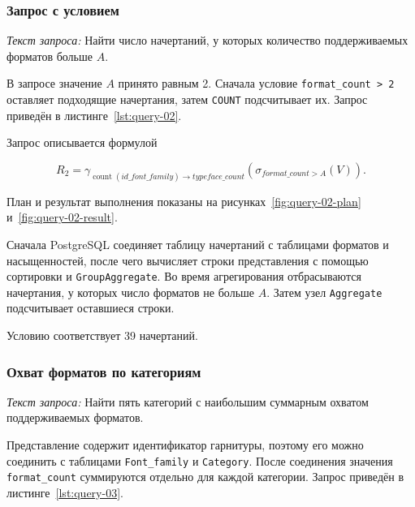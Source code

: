 \clearpage
\subsubsection{Запрос с условием}

\textit{Текст запроса:} Найти число начертаний, у которых количество поддерживаемых форматов больше
$A$.

В запросе значение $A$ принято равным 2. Сначала условие
\texttt{format_count > 2} оставляет подходящие начертания, затем
\texttt{COUNT} подсчитывает их. Запрос приведён в
листинге~\ref{lst:query-02}.


Запрос описывается формулой

\[
R_2 = \gamma_{\operatorname{count}(id\_font\_family)
\rightarrow typeface\_count}
\left(\sigma_{format\_count>A}(V)\right).
\]

План и результат выполнения показаны на
рисунках~\ref{fig:query-02-plan} и~\ref{fig:query-02-result}.


Сначала PostgreSQL соединяет таблицу начертаний с таблицами форматов и
насыщенностей, после чего вычисляет строки представления с помощью сортировки
и \texttt{GroupAggregate}. Во время агрегирования отбрасываются
начертания, у которых число форматов не больше $A$. Затем узел
\texttt{Aggregate} подсчитывает оставшиеся строки.


Условию соответствует 39 начертаний.

\subsubsection{Охват форматов по категориям}

\textit{Текст запроса:} Найти пять категорий с наибольшим суммарным охватом поддерживаемых форматов.

Представление содержит идентификатор гарнитуры, поэтому его можно соединить с
таблицами \texttt{Font_family} и \texttt{Category}. После
соединения значения \texttt{format_count} суммируются отдельно для
каждой категории. Запрос приведён в листинге~\ref{lst:query-03}.

